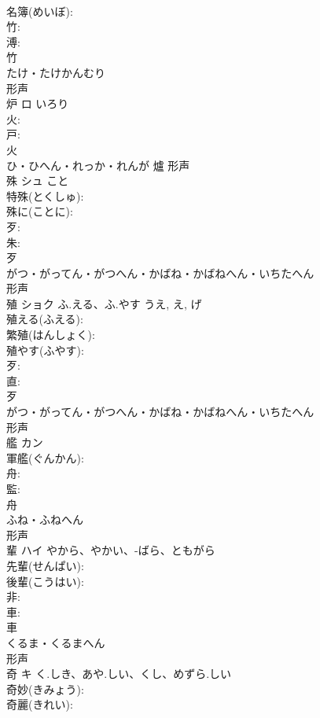 \documentclass[8pt]{extreport}
\begin{document}
\begin{CJK}{UTF8}{min}
\\	名簿(めいぼ): 
\\	竹: 
\\	溥: 
\\	竹	
\\	たけ・たけかんむり	
\\	形声 
\\	炉	ロ	いろり		
\\	火: 
\\	戸: 
\\	火	
\\	ひ・ひへん・れっか・れんが	爐	形声 
\\	殊	シュ	こと		
\\	特殊(とくしゅ): 
\\	殊に(ことに): 
\\	歹: 
\\	朱: 
\\	歹	
\\	がつ・がってん・がつへん・かばね・かばねへん・いちたへん	
\\	形声 
\\	殖	ショク	ふ.える、ふ.やす	うえ, え, げ	
\\	殖える(ふえる): 
\\	繁殖(はんしょく): 
\\	殖やす(ふやす): 
\\	歹: 
\\	直: 
\\	歹	
\\	がつ・がってん・がつへん・かばね・かばねへん・いちたへん	
\\	形声 
\\	艦	カン			
\\	軍艦(ぐんかん): 
\\	舟: 
\\	監: 
\\	舟	
\\	ふね・ふねへん	
\\	形声 
\\	輩	ハイ	やから、やかい、-ばら、ともがら		
\\	先輩(せんぱい): 
\\	後輩(こうはい): 
\\	非: 
\\	車: 
\\	車	
\\	くるま・くるまへん	
\\	形声 
\\	奇	キ	く.しき、あや.しい、くし、めずら.しい		
\\	奇妙(きみょう): 
\\	奇麗(きれい): 

\end{CJK}
\end{document}
